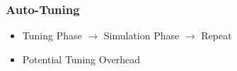 \documentclass[
	10pt,
	t		%
]{beamer}
\begin{document}
\begin{frame}
	\frametitle{Auto-Tuning }

	\begin{itemize}
		\item Tuning Phase $\rightarrow$ Simulation Phase $\rightarrow$ Repeat
		\item Potential Tuning Overhead
	\end{itemize}

	\vspace{0.1cm}

	\begin{figure}
	\end{figure}


\end{frame}
\end{document}
